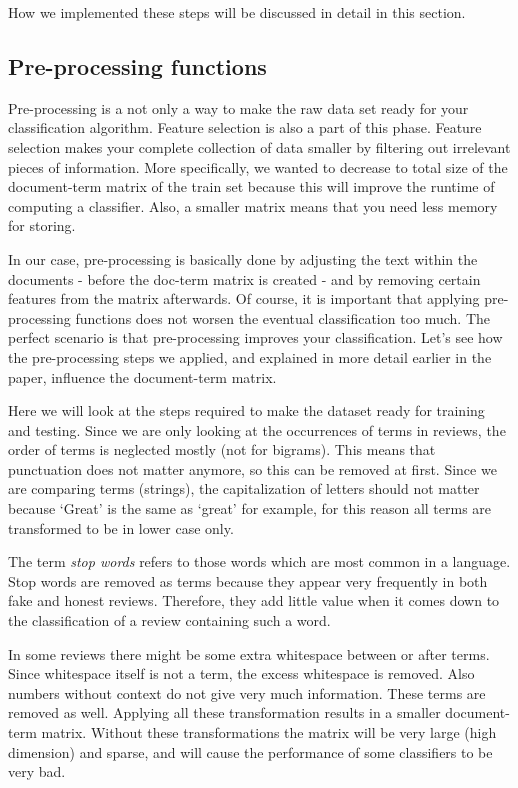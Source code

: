 \documentclass[a4paper,11pt]{article}
\begin{document}
How we implemented these steps will be discussed in detail in this section.

\subsection{Pre-processing functions}
\label{section:pre_processing}
Pre-processing is a not only a way to make the raw data set ready for your classification algorithm. Feature selection is also a part of this phase. Feature selection makes your complete collection of data smaller by filtering out irrelevant pieces of information. More specifically, we wanted to decrease to total size of the document-term matrix of the train set because this will improve the runtime of computing a classifier. Also, a smaller matrix means that you need less memory for storing.%

In our case, pre-processing is basically done by adjusting the text within the documents - before the doc-term matrix is created - and by removing certain features from the matrix afterwards. Of course, it is important that applying pre-processing functions does not worsen the eventual classification too much. The perfect scenario is that pre-processing improves your classification. Let's see how the pre-processing steps we applied, and explained in more detail earlier in the paper, influence the document-term matrix.%

Here we will look at the steps required to make the dataset ready for training and testing. Since we are only looking at the occurrences of terms in reviews, the order of terms is neglected mostly (not for bigrams). This means that punctuation does not matter anymore, so this can be removed at first. Since we are comparing terms (strings), the capitalization of letters should not matter because `Great' is the same as `great' for example, for this reason all terms are transformed to be in lower case only. %

The term \textit{stop words} refers to those words which are most common in a language. Stop words are removed as terms because they appear very frequently in both fake and honest reviews. Therefore, they add little value when it comes down to the classification of a review containing such a word. %

In some reviews there might be some extra whitespace between or after terms. Since whitespace itself is not a term, the excess whitespace is removed. Also numbers without context do not give very much information. These terms are removed as well. Applying all these transformation results in a smaller document-term matrix. Without these transformations the matrix will be very large (high dimension) and sparse, and will cause the performance of some classifiers to be very bad.%
\end{document}
